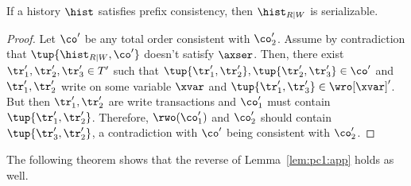  \begin{lemma}\label{lem:pc1:app}
If a history $\hist$ satisfies prefix consistency, then $\hist_{R|W}$ is serializable.
\end{lemma}
 \begin{proof}
 Let $\co'$ be any total order consistent with $\co'_2$. Assume by contradiction that $\tup{\hist_{R|W},\co'}$ doesn't satisfy $\axser$. Then, there exist $\tr'_1, \tr'_2, \tr'_3 \in T'$ such that $\tup{\tr'_1, \tr'_2}, \tup{\tr'_2, \tr'_3} \in \co'$ and $\tr'_1, \tr'_2$ write on some variable $\xvar$ and $\tup{\tr'_1, \tr'_3} \in \wro[\xvar]'$. But then $\tr'_1, \tr'_2$ are write transactions and $\co'_1$ must contain $\tup{\tr'_1, \tr'_2}$. Therefore, $\rwo(\co'_1)$ and $\co'_2$ should contain $\tup{\tr'_3, \tr'_2}$, a contradiction with $\co'$ being consistent with $\co'_2$.
 \end{proof}
 
 The following theorem shows that the reverse of Lemma~\ref{lem:pc1:app} holds as well.
 
